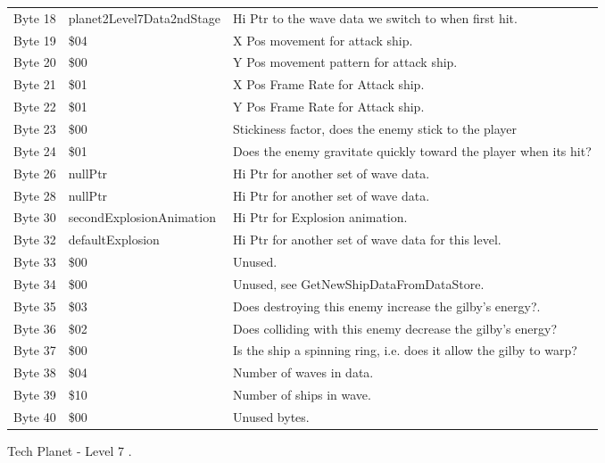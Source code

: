 \begin{figure}[H]
{\begin{adjustbox}{width=12cm}
\begin{tabular}{lll}
 Byte 18 & planet2Level7Data2ndStage & Hi Ptr to the wave data we switch to when first hit.               \\
 Byte 19 & \$04                       & X Pos movement for attack ship.                                    \\
 Byte 20 & \$00                       & Y Pos movement pattern for attack ship.                            \\
 Byte 21 & \$01                       & X Pos Frame Rate for Attack ship.                                  \\
 Byte 22 & \$01                       & Y Pos Frame Rate for Attack ship.                                  \\
 Byte 23 & \$00                       & Stickiness factor, does the enemy stick to the player              \\
 Byte 24 & \$01                       & Does the enemy gravitate quickly toward the player when its hit?   \\
 Byte 26 & nullPtr                   & Hi Ptr for another set of wave data.                               \\
 Byte 28 & nullPtr                   & Hi Ptr for another set of wave data.                               \\
 Byte 30 & secondExplosionAnimation  & Hi Ptr for Explosion animation.                                    \\
 Byte 32 & defaultExplosion          & Hi Ptr for another set of wave data for this level.                \\
 Byte 33 & \$00                       & Unused.                                                            \\
 Byte 34 & \$00                       & Unused, see GetNewShipDataFromDataStore.                           \\
 Byte 35 & \$03                       & Does destroying this enemy increase the gilby's energy?.           \\
 Byte 36 & \$02                       & Does colliding with this enemy decrease the gilby's energy?        \\
 Byte 37 & \$00                       & Is the ship a spinning ring, i.e. does it allow the gilby to warp? \\
 Byte 38 & \$04                       & Number of waves in data.                                           \\
 Byte 39 & \$10                       & Number of ships in wave.                                           \\
 Byte 40 & \$00                       & Unused bytes.                                                      \\
\bottomrule
\end{tabular}

  \end{adjustbox}

  }\caption*{Tech Planet - Level 7
.}
\end{figure}

